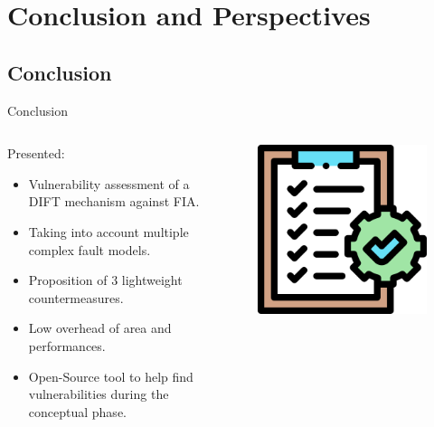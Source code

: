 \section{Conclusion and Perspectives}


\subsection{Conclusion}
\begin{frame}{Conclusion}
    \begin{columns}
        \begin{column}{.7\linewidth}
            \begin{block}{Presented:}
                \begin{itemize}
                    [triangle]
                    \item Vulnerability assessment of a DIFT mechanism against FIA.
                    \item Taking into account multiple complex fault models.
                    \item Proposition of 3 lightweight countermeasures.
                    \item Low overhead of area and performances.
                    \item Open-Source tool to help find vulnerabilities during the conceptual phase.
                \end{itemize}
            \end{block}
        \end{column}
        \begin{column}{.3\linewidth}
            \begin{figure}
                \centering
                \includegraphics[height=.25\textheight]{src/6_conclusion/img/conclusion.png}

\end{figure}
\end{column}
\end{columns}
\end{frame}
